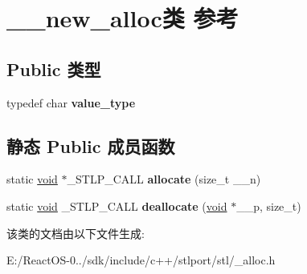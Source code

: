 \hypertarget{class____new__alloc}{}\section{\+\_\+\+\_\+new\+\_\+alloc类 参考}
\label{class____new__alloc}
\subsection*{Public 类型}
\begin{DoxyCompactItemize}
\item 
\mbox{\label{class____new__alloc_a80fafb54ff9811896661f4585e0969b6}} 
typedef char {\bfseries value\+\_\+type}
\end{DoxyCompactItemize}
\subsection*{静态 Public 成员函数}
\begin{DoxyCompactItemize}
\item 
\mbox{\label{class____new__alloc_acbf5811da088f101a1c3b8e63beca848}} 
static \hyperlink{interfacevoid}{void} $\ast$\+\_\+\+S\+T\+L\+P\+\_\+\+C\+A\+LL {\bfseries allocate} (size\+\_\+t \+\_\+\+\_\+n)
\item 
\mbox{\label{class____new__alloc_af47309837f7d65618be1edba698bc18e}} 
static \hyperlink{interfacevoid}{void} \+\_\+\+S\+T\+L\+P\+\_\+\+C\+A\+LL {\bfseries deallocate} (\hyperlink{interfacevoid}{void} $\ast$\+\_\+\+\_\+p, size\+\_\+t)
\end{DoxyCompactItemize}


该类的文档由以下文件生成\+:\begin{DoxyCompactItemize}
\item 
E\+:/\+React\+O\+S-\/0../sdk/include/c++/stlport/stl/\+\_\+alloc.\+h\end{DoxyCompactItemize}
